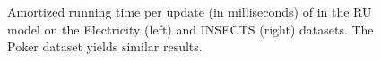 \begin{figure}
\vspace*{10pt}
    \centering
    \hfill

\caption{Amortized running time per update (in milliseconds) of \algo{} in the RU model on the Electricity (left) and INSECTS (right) datasets. The Poker dataset yields similar results.}

\label{fig:RU}
\end{figure}




